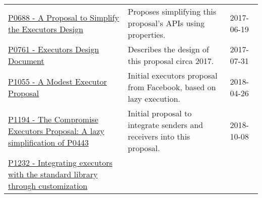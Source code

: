 \documentclass[a4paper,12pt,notitlepage,twoside,openright]{article}
\begin{document}
\begin{longtable}[]{@{}lll@{}}
\begin{minipage}[t]{0.32\columnwidth}
\href{https://wg21.link/P0688}{P0688 - A Proposal to Simplify the
Executors Design}\strut
\end{minipage} & \begin{minipage}[t]{0.54\columnwidth}\raggedright
Proposes simplifying this proposal's APIs using properties.\strut
\end{minipage} & \begin{minipage}[t]{0.05\columnwidth}\raggedright
2017-06-19\strut
\end{minipage}\tabularnewline
\begin{minipage}[t]{0.32\columnwidth}\raggedright
\href{https://wg21.link/P0761}{P0761 - Executors Design Document}\strut
\end{minipage} & \begin{minipage}[t]{0.54\columnwidth}\raggedright
Describes the design of this proposal circa 2017.\strut
\end{minipage} & \begin{minipage}[t]{0.05\columnwidth}\raggedright
2017-07-31\strut
\end{minipage}\tabularnewline
\begin{minipage}[t]{0.32\columnwidth}\raggedright
\href{https://wg21.link/P1055}{P1055 - A Modest Executor Proposal}\strut
\end{minipage} & \begin{minipage}[t]{0.54\columnwidth}\raggedright
Initial executors proposal from Facebook, based on lazy execution.\strut
\end{minipage} & \begin{minipage}[t]{0.05\columnwidth}\raggedright
2018-04-26\strut
\end{minipage}\tabularnewline
\begin{minipage}[t]{0.32\columnwidth}\raggedright
\href{https://wg21.link/P1194}{P1194 - The Compromise Executors
Proposal: A lazy simplification of P0443}\strut
\end{minipage} & \begin{minipage}[t]{0.54\columnwidth}\raggedright
Initial proposal to integrate senders and receivers into this
proposal.\strut
\end{minipage} & \begin{minipage}[t]{0.05\columnwidth}\raggedright
2018-10-08\strut
\end{minipage}\tabularnewline
\begin{minipage}[t]{0.32\columnwidth}\raggedright
\href{https://wg21.link/P1232}{P1232 - Integrating executors with the
standard library through customization}\strut

\end{minipage}
\end{longtable}
\end{document}
